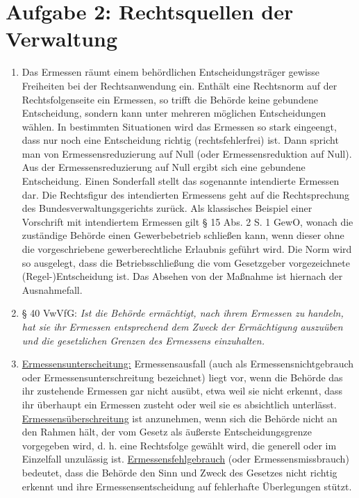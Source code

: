 \documentclass{article}
\begin{document}
	\section*{Aufgabe 2: Rechtsquellen der Verwaltung}
	\begin{enumerate}[label=(\alph*)]
		\item Das Ermessen räumt einem behördlichen Entscheidungsträger gewisse Freiheiten bei der Rechtsanwendung ein. Enthält eine Rechtsnorm auf der Rechtsfolgenseite ein Ermessen, so trifft die Behörde keine gebundene Entscheidung, sondern kann unter mehreren möglichen Entscheidungen wählen. In bestimmten Situationen wird das Ermessen so stark eingeengt, dass nur noch eine Entscheidung richtig (rechtsfehlerfrei) ist. Dann spricht man von Ermessensreduzierung auf Null (oder Ermessensreduktion auf Null). Aus der Ermessensreduzierung auf Null ergibt sich eine gebundene Entscheidung. Einen Sonderfall stellt das sogenannte intendierte Ermessen dar. Die Rechtsfigur des intendierten Ermessens geht auf die Rechtsprechung des Bundesverwaltungsgerichts zurück. Als klassisches Beispiel einer Vorschrift mit intendiertem Ermessen gilt § 15 Abs. 2 S. 1 GewO, wonach die zuständige Behörde einen Gewerbebetrieb schließen kann, wenn dieser ohne die vorgeschriebene gewerberechtliche Erlaubnis geführt wird. Die Norm wird so ausgelegt, dass die Betriebsschließung die vom Gesetzgeber vorgezeichnete (Regel-)Entscheidung ist. Das Absehen von der Maßnahme ist hiernach der Ausnahmefall.
		\item § 40 VwVfG: \textit{Ist die Behörde ermächtigt, nach ihrem Ermessen zu handeln, hat sie ihr Ermessen entsprechend dem Zweck der Ermächtigung auszuüben und die gesetzlichen Grenzen des Ermessens einzuhalten.}
		\item \underline{Ermessensunterscheitung:} Ermessensausfall (auch als Ermessensnichtgebrauch oder Ermessensunterschreitung bezeichnet) liegt vor, wenn die Behörde das ihr zustehende Ermessen gar nicht ausübt, etwa weil sie nicht erkennt, dass ihr überhaupt ein Ermessen zusteht oder weil sie es absichtlich unterlässt. \underline{Ermessensüberschreitung} ist anzunehmen, wenn sich die Behörde nicht an den Rahmen hält, der vom Gesetz als äußerste Entscheidungsgrenze vorgegeben wird, d. h. eine Rechtsfolge gewählt wird, die generell oder im Einzelfall unzulässig ist. \underline{Ermessensfehlgebrauch} (oder Ermessensmissbrauch) bedeutet, dass die Behörde den Sinn und Zweck des Gesetzes nicht richtig erkennt und ihre Ermessensentscheidung auf fehlerhafte Überlegungen stützt.
	\end{enumerate}
\end{document}

